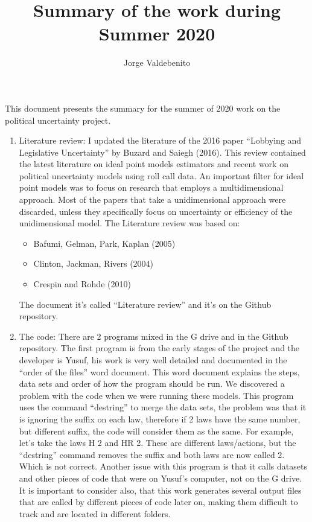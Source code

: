 \documentclass[a4paper,12pt]{article}
\begin{document}
\title{\vspace{-1.5 cm}Summary of the work during Summer 2020}
\author{Jorge Valdebenito}
\maketitle

This document presents the summary for the summer of 2020 work on the political uncertainty project. 
\begin{enumerate}
\item Literature review:
I updated the literature of the 2016 paper “Lobbying and Legislative Uncertainty” by Buzard and Saiegh (2016). This review contained the latest literature on ideal point models estimators and recent work on political uncertainty models using roll call data. An important filter for ideal point models was to focus on research that employs a multidimensional approach. Most of the papers that take a unidimensional approach were discarded, unless they specifically focus on uncertainty or efficiency of the unidimensional model.
The Literature review was based on:

\begin{itemize}
\item Bafumi, Gelman, Park, Kaplan (2005) 
\item Clinton, Jackman, Rivers (2004)
\item Crespin and Rohde (2010)
\end{itemize}
The document it’s called “Literature review” and it’s on the Github repository.



\item The code:
There are 2 programs mixed in the G drive and in the Github repository. The first program is from the early stages of the project and the developer is Yusuf, his work is very well detailed and documented in the “order of the files” word document. This word document explains the steps, data sets and order of how the program should be run. We discovered a problem with the code when we were running these models. This program uses the command “destring” to merge the data sets, the problem was that it is ignoring the suffix on each law, therefore if 2 laws have the same number, but different suffix, the code will consider them as the same. 
For example, let’s take the laws H 2 and HR 2. These are different laws/actions, but the “destring” command removes the suffix and both laws are now called 2. Which is not correct. 
Another issue with this program is that it calls datasets and other pieces of code that were on Yusuf’s computer, not on the G drive. It is important to consider also, that this work generates several output files that are called by different pieces of code later on, making them difficult to track and are located in different folders. 


\end{enumerate}
\end{document}
